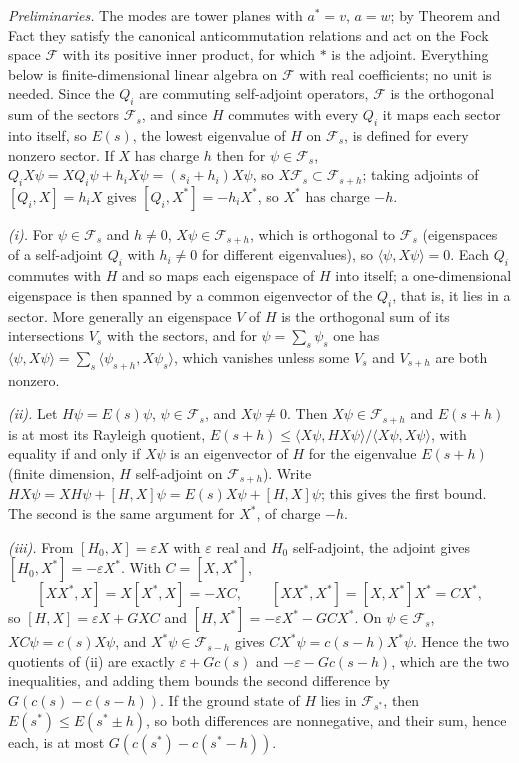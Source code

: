 \emph{Preliminaries.} The modes are tower planes with $a^{*} = v$, $a = w$; by Theorem  and Fact  they satisfy the canonical anticommutation relations and act on the Fock space $\mathcal{F}$ with its positive inner product, for which $*$ is the adjoint. Everything below is finite-dimensional linear algebra on $\mathcal{F}$ with real coefficients; no unit is needed. Since the $Q_{i}$ are commuting self-adjoint operators, $\mathcal{F}$ is the orthogonal sum of the sectors $\mathcal{F}_{s}$, and since $H$ commutes with every $Q_{i}$ it maps each sector into itself, so $E(s)$, the lowest eigenvalue of $H$ on $\mathcal{F}_{s}$, is defined for every nonzero sector. If $X$ has charge $h$ then for $\psi \in \mathcal{F}_{s}$, $Q_{i}X\psi = XQ_{i}\psi + h_{i}X\psi = (s_{i} + h_{i})X\psi$, so $X\mathcal{F}_{s} \subset \mathcal{F}_{s+h}$; taking adjoints of $[Q_{i}, X] = h_{i}X$ gives $[Q_{i}, X^{*}] = -h_{i}X^{*}$, so $X^{*}$ has charge $-h$.

\emph{(i).} For $\psi \in \mathcal{F}_{s}$ and $h \ne 0$, $X\psi \in \mathcal{F}_{s+h}$, which is orthogonal to $\mathcal{F}_{s}$ (eigenspaces of a self-adjoint $Q_{i}$ with $h_{i} \ne 0$ for different eigenvalues), so $\langle\psi, X\psi\rangle = 0$. Each $Q_{i}$ commutes with $H$ and so maps each eigenspace of $H$ into itself; a one-dimensional eigenspace is then spanned by a common eigenvector of the $Q_{i}$, that is, it lies in a sector. More generally an eigenspace $V$ of $H$ is the orthogonal sum of its intersections $V_{s}$ with the sectors, and for $\psi = \sum_{s}\psi_{s}$ one has $\langle\psi, X\psi\rangle = \sum_{s}\langle\psi_{s+h}, X\psi_{s}\rangle$, which vanishes unless some $V_{s}$ and $V_{s+h}$ are both nonzero.

\emph{(ii).} Let $H\psi = E(s)\psi$, $\psi \in \mathcal{F}_{s}$, and $X\psi \ne 0$. Then $X\psi \in \mathcal{F}_{s+h}$ and $E(s+h)$ is at most its Rayleigh quotient, $E(s+h) \le \langle X\psi, HX\psi\rangle/\langle X\psi, X\psi\rangle$, with equality if and only if $X\psi$ is an eigenvector of $H$ for the eigenvalue $E(s+h)$ (finite dimension, $H$ self-adjoint on $\mathcal{F}_{s+h}$). Write $HX\psi = XH\psi + [H, X]\psi = E(s)X\psi + [H, X]\psi$; this gives the first bound. The second is the same argument for $X^{*}$, of charge $-h$.

\emph{(iii).} From $[H_{0}, X] = \varepsilon X$ with $\varepsilon$ real and $H_{0}$ self-adjoint, the adjoint gives $[H_{0}, X^{*}] = -\varepsilon X^{*}$. With $C = [X, X^{*}]$,
\[
[XX^{*}, X] = X[X^{*}, X] = -XC, \qquad [XX^{*}, X^{*}] = [X, X^{*}]X^{*} = CX^{*},
\]
so $[H, X] = \varepsilon X + GXC$ and $[H, X^{*}] = -\varepsilon X^{*} - GCX^{*}$. On $\psi \in \mathcal{F}_{s}$, $XC\psi = c(s)X\psi$, and $X^{*}\psi \in \mathcal{F}_{s-h}$ gives $CX^{*}\psi = c(s - h)X^{*}\psi$. Hence the two quotients of (ii) are exactly $\varepsilon + Gc(s)$ and $-\varepsilon - Gc(s - h)$, which are the two inequalities, and adding them bounds the second difference by $G(c(s) - c(s - h))$. If the ground state of $H$ lies in $\mathcal{F}_{s^{*}}$, then $E(s^{*}) \le E(s^{*} \pm h)$, so both differences are nonnegative, and their sum, hence each, is at most $G(c(s^{*}) - c(s^{*} - h))$.

